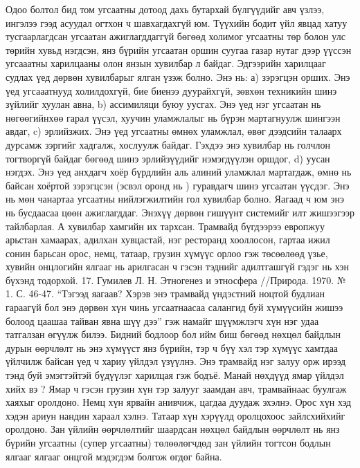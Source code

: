 Одоо болтол бид том угсаатны дотоод дахь бутархай бүлгүүдийг авч үзлээ, ингэлээ гээд асуудал огтхон ч шавхагдахгүй юм. Түүхийн бодит үйл явцад хатуу тусгаарлагдсан угсаатан ажиглагддаггүй бөгөөд холимог угсаатны төр болон улс төрийн хувьд нэгдсэн, янз бүрийн угсаатан оршин суугаа газар нутаг дээр үүссэн угсааатны харилцааны олон янзын хувилбар л байдаг. Эдгээрийн харилцааг судлах үед дөрвөн хувилбарыг ялган үзэж болно. Энэ нь: а) зэрэгцэн орших. Энэ үед угсааатнууд холилдохгүй, бие биенээ дуурайхгүй, зөвхөн техникийн шинэ зүйлийг хуулан авна, b) ассимиляци буюу уусгах. Энэ үед нэг угсаатан нь нөгөөгийнхөө гарал үүсэл, хуучин уламжлалыг нь бүрэн мартагнуулж шингээн авдаг, c) эрлийзжих. Энэ үед угсаатны өмнөх уламжлал, өвөг дээдсийн талаарх дурсамж зэргийг хадгалж, хослуулж байдаг. Гэхдээ энэ хувилбар нь голчлон тогтворгүй байдаг бөгөөд шинэ эрлийзүүдийг нэмэгдүүлэн оршдог, d) уусан нэгдэх. Энэ үед анхдагч хоёр бүрдлийн аль алиний уламжлал мартагдаж, өмнө нь байсан хоёртой зэрэгцсэн (эсвэл оронд нь ) гуравдагч шинэ угсаатан үүсдэг. Энэ нь мөн чанартаа угсаатны нийлэгжилтийн гол хувилбар болно. Яагаад ч юм энэ нь бусдаасаа цөөн ажиглагддаг.
Энэхүү дөрвөн гишүүнт системийг илт жишээгээр тайлбарлая. А хувилбар хамгийн их тархсан. Трамвайд бүгдээрээ европжуу арьстан хамаарах, адилхан хувцастай, нэг ресторанд хооллосон, гартаа ижил сонин барьсан орос, немц, татаар, грузин хүмүүс орлоо гэж төсөөлөөд үзье, хувийн онцлогийн ялгааг нь арилгасан ч гэсэн тэднийг адилтгашгүй гэдэг нь хэн бүхэнд тодорхой. 17. Гумилев Л. Н. Этногенез и этносфера //Природа. 1970. № 1. С. 46-47.
“Тэгээд яагаав? Хэрэв энэ трамвайд үндэстний ноцтой будлиан гараагүй бол энэ дөрвөн хүн чинь угсаатнаасаа салангид буй хүмүүсийн жишээ болоод цаашаа тайван явна шүү дээ” гэж намайг шүүмжлэгч хүн нэг удаа татгалзан өгүүлж билээ. Бидний бодлоор бол ийм биш бөгөөд нөхцөл байдлын дурын өөрчлөлт нь энэ хүмүүст янз бүрийн, тэр ч бүү хэл тэр хүмүүс хамтдаа үйлчилж байсан үед ч хариу үйлдэл үзүүлнэ. Энэ трамвайд нэг залуу орж ирээд тэнд буй эмэгтэйтэй бүдүүлэг харилцая гэж бодъё. Манай нөхдүүд ямар үйлдэл хийх вэ ? Ямар ч гэсэн грузин хүн тэр залууг заамдан авч, трамвайнаас буулгаж хаяхыг оролдоно. Немц хүн ярвайн анивчиж, цагдаа дуудаж эхэлнэ. Орос хүн хэд хэдэн ариун нандин хараал хэлнэ. Татаар хүн хэрүүлд оролцохоос зайлсхийхийг оролдоно. Зан үйлийн өөрчлөлтийг шаардсан нөхцөл байдлын өөрчлөлт нь янз бүрийн угсаатны (супер угсаатны) төлөөлөгчдөд зан үйлийн тогтсон бодлын ялгааг ялгааг онцгой мэдэгдэм болгож өгдөг байна.
